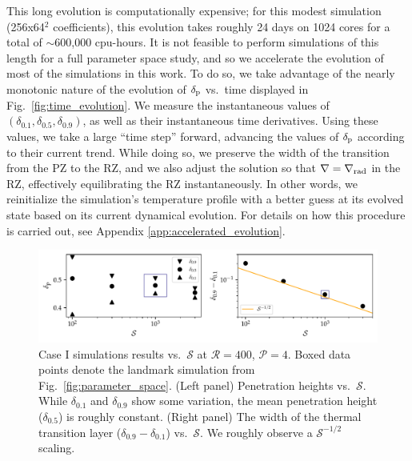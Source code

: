 \documentclass[twocolumn]{aastex631}
\newcommand{\gradrad}{\ensuremath{\nabla_{\rm{rad}}}}
\newcommand{\justgrad}{\ensuremath{\nabla}}
\newcommand{\delp}{\ensuremath{\delta_{\rm{p}}}}
\newcommand{\mP}{\ensuremath{\mathcal{P}}}
\newcommand{\mR}{\ensuremath{\mathcal{R}}}
\newcommand{\mS}{\ensuremath{\mathcal{S}}}
\begin{document}
This long evolution is computationally expensive; for this modest simulation (256x64$^2$ coefficients), this evolution takes roughly 24 days on 1024 cores for a total of $\sim$600,000 cpu-hours.
It is not feasible to perform simulations of this length for a full parameter space study, and so we accelerate the evolution of most of the simulations in this work.
To do so, we take advantage of the nearly monotonic nature of the evolution of $\delp$ vs.~time displayed in Fig.~\ref{fig:time_evolution}.
We measure the instantaneous values of $(\delta_{0.1}, \delta_{0.5}, \delta_{0.9})$, as well as their instantaneous time derivatives.
Using these values, we take a large ``time step'' forward, advancing the values of $\delp$ according to their current trend.
While doing so, we preserve the width of the transition from the PZ to the RZ, and we also adjust the solution so that $\justgrad = \gradrad$ in the RZ, effectively equilibrating the RZ instantaneously.
In other words, we reinitialize the simulation's temperature profile with a better guess at its evolved state based on its current dynamical evolution.
For details on how this procedure is carried out, see Appendix \ref{app:accelerated_evolution}.

\begin{figure}[t]
\centering
\includegraphics{parameters_vs_s.pdf}
\caption{
Case I simulations results vs.~$\mS$ at $\mR = 400$, $\mP = 4$.
Boxed data points denote the landmark simulation from Fig.~\ref{fig:parameter_space}.
(Left panel) Penetration heights vs.~$\mS$.
While $\delta_{0.1}$ and $\delta_{0.9}$ show some variation, the mean penetration height ($\delta_{0.5}$) is roughly constant.
(Right panel) The width of the thermal transition layer ($\delta_{0.9} - \delta_{0.1}$) vs.~$\mS$.
We roughly observe a $\mS^{-1/2}$ scaling.
\label{fig:parameters_vs_s}
}
\end{figure}
\end{document}
